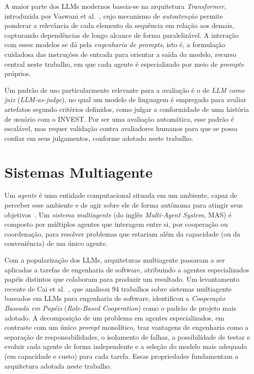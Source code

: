 A maior parte dos LLMs modernos baseia-se na arquitetura \textit{Transformer}, introduzida por Vaswani et al.~\cite{vaswani2017attention}, cujo mecanismo de \textit{autoatenção} permite ponderar a relevância de cada elemento da sequência em relação aos demais, capturando dependências de longo alcance de forma paralelizável. A interação com esses modelos se dá pela \textit{engenharia de \textit{prompts}}, isto é, a formulação cuidadosa das instruções de entrada para orientar a saída do modelo, recurso central neste trabalho, em que cada agente é especializado por meio de \textit{prompts} próprios.

Um padrão de uso particularmente relevante para a avaliação é o de \textit{LLM como juiz} (\textit{LLM-as-judge}), no qual um modelo de linguagem é empregado para avaliar artefatos segundo critérios definidos, como julgar a conformidade de uma história de usuário com o INVEST. Por ser uma avaliação automática, esse padrão é escalável, mas requer validação contra avaliadores humanos para que se possa confiar em seus julgamentos, conforme adotado neste trabalho.

\section{Sistemas Multiagente}
\label{sec:mas}

Um \textit{agente} é uma entidade computacional situada em um ambiente, capaz de perceber esse ambiente e de agir sobre ele de forma autônoma para atingir seus objetivos~\cite{wooldridge2009}. Um \textit{sistema multiagente} (do inglês \textit{Multi-Agent System}, MAS) é composto por múltiplos agentes que interagem entre si, por cooperação ou coordenação, para resolver problemas que estariam além da capacidade (ou da conveniência) de um único agente.

Com a popularização dos LLMs, arquiteturas multiagente passaram a ser aplicadas a tarefas de engenharia de software, atribuindo a agentes especializados papéis distintos que colaboram para produzir um resultado. Um levantamento recente de Cai et al.~\cite{cai2025designing}, que analisou 94 trabalhos sobre sistemas multiagente baseados em LLMs para engenharia de software, identificou a \textit{Cooperação Baseada em Papéis} (\textit{Role-Based Cooperation}) como o padrão de projeto mais adotado. A decomposição de um problema em agentes especializados, em contraste com um único \textit{prompt} monolítico, traz vantagens de engenharia como a separação de responsabilidades, o isolamento de falhas, a possibilidade de testar e evoluir cada agente de forma independente e a seleção do modelo mais adequado (em capacidade e custo) para cada tarefa. Essas propriedades fundamentam a arquitetura adotada neste trabalho.

